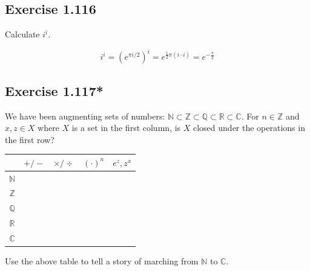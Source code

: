 \documentclass{article}
\begin{document}
\subsection{Exercise 1.116}
Calculate $i^i$.

\begin{solution}
  \[
    i^i = (e^{\pi i / 2})^{i} = e^{\frac{1}{2} \pi (i \cdot i)} =
    e^{-\frac{\pi}{2}}
  \]
\end{solution}

\subsection{Exercise 1.117*}
We have been augmenting sets of numbers: $\mathbb{N} \subset
\mathbb{Z} \subset \mathbb{Q} \subset \mathbb{R} \subset \mathbb{C}$.
For $n \in \mathbb{Z}$ and $x, z \in X$ where $X$ is a set in the
first column, is $X$ closed under the operations in the first row?
\begin{center}
  \begin{tabular}{|c|c|c|c|c|}
    \hline
    & $+/-$ & $\times/\div$ & $(\cdot)^n$ & $e^z, z^x$ \\ \hline
    $\mathbb{N}$ & & & & \\ \hline
    $\mathbb{Z}$ & & & & \\ \hline
    $\mathbb{Q}$ & & & & \\ \hline
    $\mathbb{R}$ & & & & \\ \hline
    $\mathbb{C}$ & & & & \\ \hline
  \end{tabular}
\end{center}
Use the above table to tell a story of marching from $\mathbb{N}$ to
$\mathbb{C}$.
\end{document}

